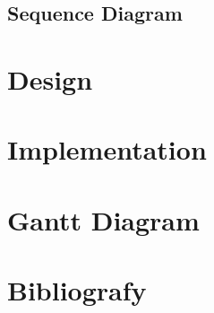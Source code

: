 \documentclass[11pt]{article}
\begin{document}
    \subsection{Sequence Diagram}
    
    \newpage
    \section{Design}
    
    \newpage
    \section{Implementation}
    
    \newpage
    \section{Gantt Diagram}
    
    \newpage
    \section{Bibliografy}
\end{document}
